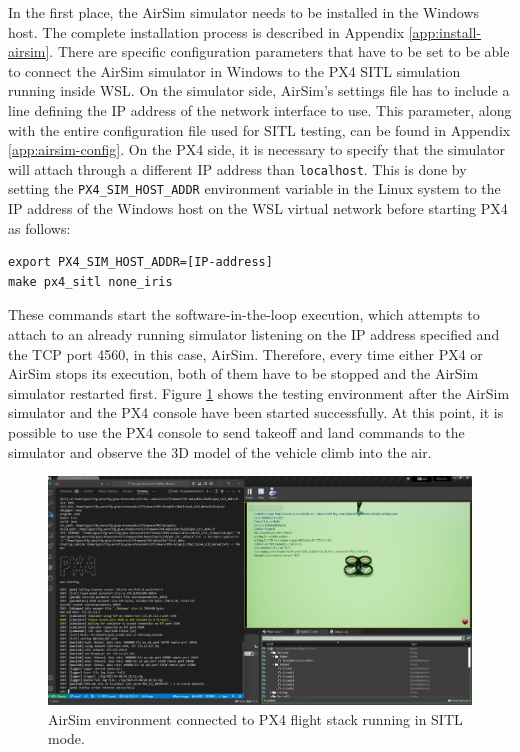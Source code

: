 In the first place, the AirSim simulator needs to be installed in the Windows host.
The complete installation process is described in Appendix \ref{app:install-airsim}.
There are specific configuration parameters that have to be set to be able to connect the AirSim simulator in Windows to the PX4 SITL simulation running inside WSL.
On the simulator side, AirSim's settings file has to include a line defining the IP address of the network interface to use.
This parameter, along with the entire configuration file used for SITL testing, can be found in Appendix \ref{app:airsim-config}.
On the PX4 side, it is necessary to specify that the simulator will attach through a different IP address than \texttt{localhost}.
This is done by setting the \texttt{PX4\_SIM\_HOST\_ADDR} environment variable in the Linux system to the IP address of the Windows host on the WSL virtual network before starting PX4 as follows:
\begin{verbatim}
export PX4_SIM_HOST_ADDR=[IP-address]
make px4_sitl none_iris
\end{verbatim}
These commands start the software-in-the-loop execution, which attempts to attach to an already running simulator listening on the IP address specified and the TCP port 4560, in this case, AirSim.
Therefore, every time either PX4 or AirSim stops its execution, both of them have to be stopped and the AirSim simulator restarted first.
Figure \ref{fig:airsim-sitl} shows the testing environment after the AirSim simulator and the PX4 console have been started successfully.
At this point, it is possible to use the PX4 console to send takeoff and land commands to the simulator and observe the 3D model of the vehicle climb into the air.

\begin{figure}
  \centering
  \includegraphics[width=\textwidth, keepaspectratio]{img/airsim-sitl.png}
  \caption{AirSim environment connected to PX4 flight stack running in SITL mode.}
  \label{fig:airsim-sitl}
\end{figure}

